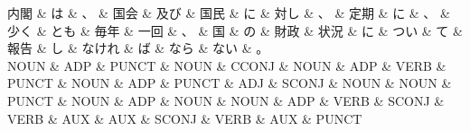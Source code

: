 \documentclass[tikz,border=5pt]{standalone}
\begin{document}
\small
\begin{dependency}[edge unit distance=10.4pt]
    \begin{deptext}[column sep=0.5em]
        内閣 \& は \& 、 \& 国会 \& 及び \& 国民 \& に \& 対し \& 、 \& 定期 \& に \& 、 \& 少く \& とも \& 毎年 \& 一回 \& 、 \& 国 \& の \& 財政 \& 状況 \& に \& つい \& て \& 報告 \& し \& なけれ \& ば \& なら \& ない \& 。\\
        NOUN \& ADP \& PUNCT \& NOUN \& CCONJ \& NOUN \& ADP \& VERB \& PUNCT \& NOUN \& ADP \& PUNCT \& ADJ \& SCONJ \& NOUN \& NOUN \& PUNCT \& NOUN \& ADP \& NOUN \& NOUN \& ADP \& VERB \& SCONJ \& VERB \& AUX \& AUX \& SCONJ \& VERB \& AUX \& PUNCT\\
    \end{deptext}
\end{dependency}
\end{document}
